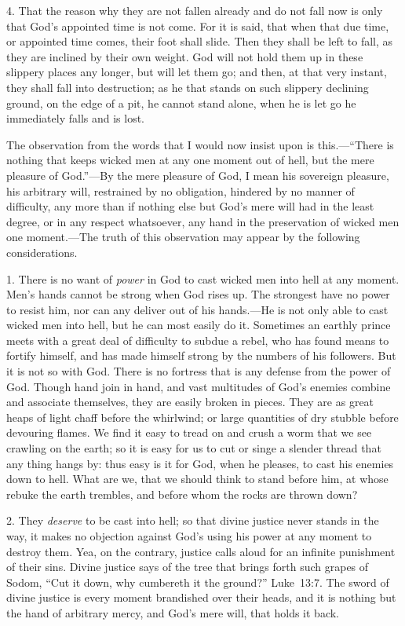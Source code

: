\documentclass[
]{book}
\begin{document}
4. That the reason why they are not fallen already and do not fall now is only that God's appointed time is not come. For it is said, that when that due time, or appointed time comes, their foot shall slide. Then they shall be left to fall, as they are inclined by their own weight. God will not hold them up in these slippery places any longer, but will let them go; and then, at that very instant, they shall fall into destruction; as he that stands on such slippery declining ground, on the edge of a pit, he cannot stand alone, when he is let go he immediately falls and is lost.

The observation from the words that I would now insist upon is this.---``There is nothing that keeps wicked men at any one moment out of hell, but the mere pleasure of God.''---By the mere pleasure of God, I mean his sovereign pleasure, his arbitrary will, restrained by no obligation, hindered by no manner of difficulty, any more than if nothing else but God's mere will had in the least degree, or in any respect whatsoever, any hand in the preservation of wicked men one moment.---The truth of this observation may appear by the following considerations.

1. There is no want of \emph{power} in God to cast wicked men into hell at any moment. Men's hands cannot be strong when God rises up. The strongest have no power to resist him, nor can any deliver out of his hands.---He is not only able to cast wicked men into hell, but he can most easily do it. Sometimes an earthly prince meets with a great deal of difficulty to subdue a rebel, who has found means to fortify himself, and has made himself strong by the numbers of his followers. But it is not so with God. There is no fortress that is any defense from the power of God. Though hand join in hand, and vast multitudes of God's enemies combine and associate themselves, they are easily broken in pieces. They are as great heaps of light chaff before the whirlwind; or large quantities of dry stubble before devouring flames. We find it easy to tread on and crush a worm that we see crawling on the earth; so it is easy for us to cut or singe a slender thread that any thing hangs by: thus easy is it for God, when he pleases, to cast his enemies down to hell. What are we, that we should think to stand before him, at whose rebuke the earth trembles, and before whom the rocks are thrown down?

2. They \emph{deserve} to be cast into hell; so that divine justice never stands in the way, it makes no objection against God's using his power at any moment to destroy them. Yea, on the contrary, justice calls aloud for an infinite punishment of their sins. Divine justice says of the tree that brings forth such grapes of Sodom, ``Cut it down, why cumbereth it the ground?'' Luke~13:7. The sword of divine justice is every moment brandished over their heads, and it is nothing but the hand of arbitrary mercy, and God's mere will, that holds it back.
\end{document}

